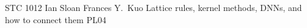 	{STC 1012}	%
	{Ian Sloan}		%
	{Frances Y.~Kuo}	%
	{Lattice rules, kernel methods, DNNs, and how to connect them}		%
	{PL04}			%
	\\\hline
